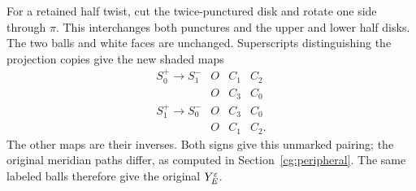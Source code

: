 For a retained half twist, cut the twice-punctured disk and rotate
one side through $\pi$. This interchanges both punctures and the
upper and lower half disks. The two balls and white faces are
unchanged. Superscripts distinguishing the projection copies give
the new shaded maps
\begin{equation}\label{cg:odd-pairing}
\begin{array}{c|ccc}
 S_0^+\longrightarrow S_1^-&O&C_1&C_2\\
                          &O&C_3&C_0\\ \hline
 S_1^+\longrightarrow S_0^-&O&C_3&C_0\\
                          &O&C_1&C_2 .
\end{array}
\end{equation}
The other maps are their inverses. Both signs give this unmarked
pairing; the original meridian paths differ, as computed in
Section~\ref{cg:peripheral}. The same labeled balls therefore give
the original $Y^\varepsilon_E$.

